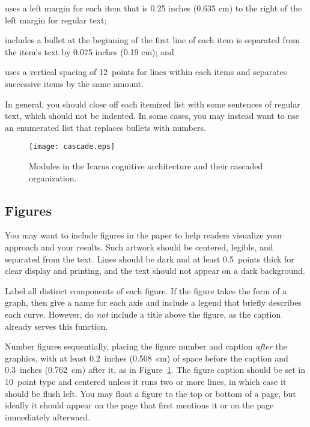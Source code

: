 \documentclass[11pt,letterpaper]{article}
\begin{document}
\cbullet 
uses a left margin for each item that is 0.25 inches (0.635 cm) to the 
right of the left margin for regular text; 

\cbullet 
includes a bullet at the beginning of the first line of each item is
separated from the item's text by 0.075 inches (0.19 cm); and

\cbullet 
uses a vertical spacing of 12~points for lines within each items 
and separates successive items by the same amount. 

\vskip 0.05in
\noindent
In general, you should close off each itemized list with some sentences 
of regular text, which should not be indented. In some cases, you may
instead want to use an enumerated list that replaces bullets with numbers. 

\begin{figure}[t]
\vskip 0.05in
\begin{center}
\texttt{[image: cascade.eps]}
\caption{Modules in the {\sc Icarus} cognitive architecture and their
         cascaded organization.} 
\label{sample-figure}
\end{center}
\vskip -0.2in
\end{figure} 

\subsection{Figures}
 
You may want to include figures in the paper to help readers visualize
your approach and your results. Such artwork should be centered,
legible, and separated from the text. Lines should be dark and at
least 0.5~points thick for clear display and printing, and the text 
should not appear on a dark background.



Label all distinct components of each figure. If the figure takes
the form of a graph, then give a name for each axis and include a 
legend that briefly describes each curve. However, do {\it not\/} 
include a title above the figure, as the caption already serves
this function. 

Number figures sequentially, placing the figure number and caption
{\it after\/} the graphics, with at least 0.2~inches (0.508~cm) of 
space before the caption and 0.3~inches (0.762~cm) after it, as in
Figure~\ref{sample-figure}. The figure caption should be set in
10~point type and centered unless it runs two or more lines, in which
case it should be flush left. You may float a figure to the top or
bottom of a page, but ideally it should appear on the page that
first mentions it or on the page immediately afterward. 
 
\end{document}
